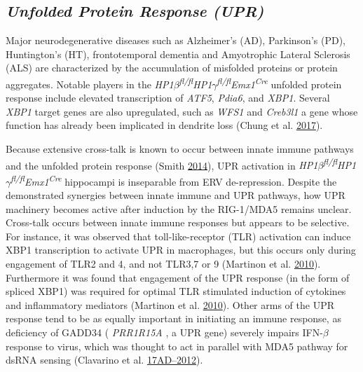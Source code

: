\documentclass[onehalf,12pt]{beavtex}
\begin{document}
  \FloatBarrier
  
  \subsection*{\texorpdfstring{\emph{Unfolded Protein Response
  (UPR)}}{Unfolded Protein Response (UPR)}}\label{unfolded-protein-response-upr}
  
  Major neurodegenerative diseases such as Alzheimer's (AD), Parkinson's
  (PD), Huntington's (HT), frontotemporal dementia and Amyotrophic Lateral
  Sclerosis (ALS) are characterized by the accumulation of misfolded
  proteins or protein aggregates. Notable players in the
  \emph{HP1\(\beta\)\textsuperscript{fl/fl}HP1\(\gamma\)\textsuperscript{fl/fl}Emx1\textsuperscript{Cre}}
  unfolded protein response include elevated transcription of \emph{ATF5},
  \emph{Pdia6}, and \emph{XBP1}. Several \emph{XBP1} target genes are also
  upregulated, such as \emph{WFS1} and \emph{Creb3l1} a gene whose
  function has already been implicated in dendrite loss (Chung et al.
  \protect\hyperlink{ref-ChungGolgiOutpostSynthesis2017}{2017}).
  
  Because extensive cross-talk is known to occur between innate immune
  pathways and the unfolded protein response (Smith
  \protect\hyperlink{ref-Smithnewparadigminnate2014}{2014}), UPR
  activation in
  \emph{HP1\(\beta\)\textsuperscript{fl/fl}HP1\(\gamma\)\textsuperscript{fl/fl}Emx1\textsuperscript{Cre}}
  hippocampi is inseparable from ERV de-repression. Despite the
  demonstrated synergies between innate immune and UPR pathways, how UPR
  machinery becomes active after induction by the RIG-1/MDA5 remains
  unclear. Cross-talk occurs between innate immune responses but appears
  to be selective. For instance, it was observed that toll-like-receptor
  (TLR) activation can induce XBP1 transcription to activate UPR in
  macrophages, but this occurs only during engagement of TLR2 and 4, and
  not TLR3,7 or 9 (Martinon et al.
  \protect\hyperlink{ref-MartinonTLRactivationtranscription2010}{2010}).
  Furthermore it was found that engagement of the UPR response (in the
  form of spliced XBP1) was required for optimal TLR stimulated induction
  of cytokines and inflammatory mediators (Martinon et al.
  \protect\hyperlink{ref-MartinonTLRactivationtranscription2010}{2010}).
  Other arms of the UPR response tend to be as equally important in
  initiating an immune response, as deficiency of GADD34 ( \emph{PRR1R15A}
  , a UPR gene) severely impairs IFN-\(\beta\) response to virus, which
  was thought to act in parallel with MDA5 pathway for dsRNA sensing
  (Clavarino et al.
  \protect\hyperlink{ref-ClavarinoInductionGADD34Necessary2012}{17AD--2012}).
  
\end{document}
